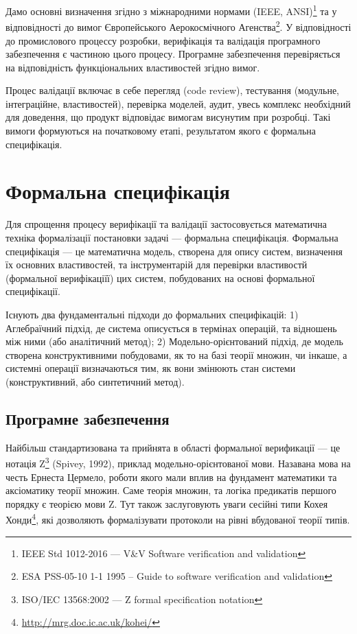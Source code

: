 Дамо основні визначення згідно з міжнародними нормами (IEEE, ANSI)\footnote{IEEE Std 1012-2016  --- V\&V Software verification and validation} та у відповідності до вимог
Європейського Аерокосмічного Агенства\footnote{ESA PSS-05-10 1-1 1995 -- Guide to software verification and validation}.
У відповідності до промислового процессу розробки, верифікація та валідація програмного
забезпечення є частиною цього процесу. Програмне забезпечення перевіряється на
відповідність функціональних властивостей згідно вимог.

Процес валідації включає в себе перегляд (code review),
тестування (модульне, інтеграційне, властивостей), перевірка моделей, аудит,
увесь комплекс необхідний для доведення, що продукт відповідає вимогам
висунутим при розробці. Такі вимоги формуються на початковому етапі,
результатом якого є формальна специфікація.

\section{Формальна специфікація}
Для спрощення процесу верифікації та валідації
застосовується математична техніка формалізації постановки задачі --- формальна специфікація.
Формальна специфікація --- це математична модель, створена для опису систем,
визначення їх основних властивостей, та інструментарій для перевірки
властивостй (формальної верифікаціїї) цих систем, побудованих на основі формальної специфікації.

Існують два фундаментальні підходи до формальних специфікацій:
1) Аглебраїчний підхід, де система описується в термінах операцій, та відношень між ними (або аналітичний метод);
2) Модельно-орієнтований підхід, де модель створена конструктивними побудовами,
   як то на базі теорії множин, чи інкаше, а системні операції визначаються тим,
   як вони змінюють стан системи (конструктивний, або синтетичний метод).

\subsection{Програмне забезпечення}
Найбільш стандартизована та прийнята в області формальної верификації --- це нотація
Z\footnote{ISO/IEC 13568:2002 --- Z formal specification notation} (Spivey, 1992), приклад
модельно-орієнтованої мови. Назавана мова на честь Ернеста Цермело, роботи якого мали вплив на
фундамент математики та аксіоматику теорії множин. Саме теорія множин, та логіка предикатів
першого порядку є теорією мови Z. Тут також заслуговують уваги сесійні типи
Кохея Хонди\footnote{\url{ http://mrg.doc.ic.ac.uk/kohei/}}, які дозволяють
формалізувати протоколи на рівні вбудованої теорії типів.

